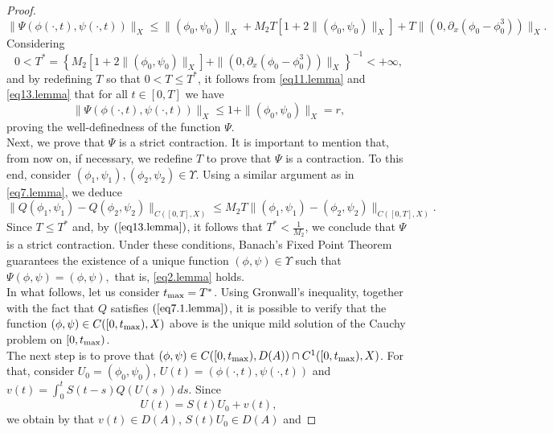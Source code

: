 \documentclass[12pt,reqno,a4paper]{amsart} %
\numberwithin{equation}{section}
\numberwithin{figure}{section}
\begin{document}
\begin{proof}
\begin{equation}
\|	\Psi(\phi(\cdot,t), \psi(\cdot, t))\|_X\leq \|(\phi_0,\psi_0)\|_X+ M_2T[1+2\|(\phi_0,\psi_0)\|_X]  +T\|(0,\partial_x(\phi_0-\phi^3_0))\|_X. 
\end{equation}
Considering 
\begin{equation}\label{eq13.lemma}  
	0<T^*=\left\{  M_2[1+2\|(\phi_0,\psi_0)\|_X]+\|(0,\partial_x(\phi_0-\phi^3_0))\|_X \right\}^{-1}<+\infty, 
\end{equation}
and by redefining $T$ so that $0<T\leq T^*$, it follows from \eqref{eq11.lemma} and \eqref{eq13.lemma} that for all $t\in [0,T]$ we have
\begin{equation}\label{eq14.lemma}  
	\|	\Psi(\phi(\cdot,t), \psi(\cdot, t))\|_X\leq1+\|(\phi_0,\psi_0)\|_X=r, 
\end{equation}proving the well-definedness of the function $\Psi$.\\
\indent  Next, we prove that $\Psi$ is a strict contraction. It is important to mention that, from now on, if necessary, we redefine $T$ to prove that $\Psi$ is a contraction. To this end, consider $(\phi_1,\psi_1), (\phi_2,\psi_2)\in \Upsilon$. Using a similar argument as in \eqref{eq7.lemma}, we deduce
\begin{equation}\label{eq16.lemma}  
		\|Q(\phi_1, \psi_1)-Q(\phi_2, \psi_2)\|_{C([0,T],X)}\leq  M_2T\|(\phi_1,\psi_1)-(\phi_2, \psi_2)\|_{C([0,T],X)}.
\end{equation} Since $T\leq T^{*}$ and, by $(\ref{eq13.lemma})$, it follows that $T^{*}<\frac{1}{M_2}$, we conclude that $\Psi$ is a strict contraction. Under these conditions, Banach’s Fixed Point Theorem guarantees the existence of a unique function $(\phi, \psi)\in \Upsilon$ such that $\Psi( \phi, \psi)=(\phi, \psi),$ that is, \eqref{eq2.lemma} holds. \\
\indent In what follows, let us consider $t_{\rm{max}}=T^{*}$. Using Gronwall’s inequality, together with the fact that $Q$ satisfies $(\ref{eq7.1.lemma})$, it is possible to verify that the function $(\phi, \psi)\in C([0,t_{\rm{max}}), X)$ above is the unique mild solution of the Cauchy problem on $[0, t_{\rm{max}})$.\\
\indent The next step is to prove that $(\phi,\psi)\in C([0,t_{\rm{max}}),D(A))\cap C^1([0,t_{\rm{max}}),X) $. For that, consider $U_0=(\phi_0, \psi_0)$, $U(t)= (\phi(\cdot, t), \psi(\cdot, t))$ and $ v(t)=\int_{0}^{t}S(t-s)Q(U(s))ds$. Since
\begin{equation}\label{eq17.lemma}  
	U(t)= S(t) U_0+v(t),
\end{equation}we obtain by
\cite[Chapter 1, Theorem 2.4]{pazy} that $v(t)\in D(A)$, $S(t)U_0 \in D(A)$ and 

\end{proof}
\end{document}
